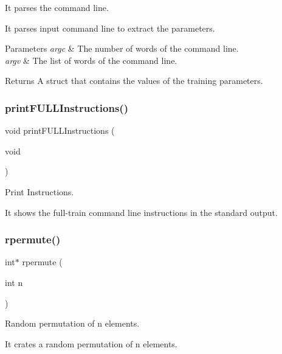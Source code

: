 It parses the command line. 

It parses input command line to extract the parameters. 
\begin{DoxyParams}{Parameters}
{\em argc} & The number of words of the command line. \\
\hline
{\em argv} & The list of words of the command line. \\
\hline
\end{DoxyParams}
\begin{DoxyReturn}{Returns}
A struct that contains the values of the training parameters. 
\end{DoxyReturn}
\hypertarget{full-train_8h_ab5adf9258f0268e7daead3642e1d911a}{}\label{full-train_8h_ab5adf9258f0268e7daead3642e1d911a} 
\subsubsection{\texorpdfstring{print\+F\+U\+L\+L\+Instructions()}{printFULLInstructions()}}
{\ttfamily void print\+F\+U\+L\+L\+Instructions (\begin{DoxyParamCaption}\item[{void}]{ }\end{DoxyParamCaption})}



Print Instructions. 

It shows the full-\/train command line instructions in the standard output. \hypertarget{full-train_8h_a9e75aabe599f48c66cbda89320d68a71}{}\label{full-train_8h_a9e75aabe599f48c66cbda89320d68a71} 
\subsubsection{\texorpdfstring{rpermute()}{rpermute()}}
{\ttfamily int$\ast$ rpermute (\begin{DoxyParamCaption}\item[{int}]{n }\end{DoxyParamCaption})}



Random permutation of n elements. 

It crates a random permutation of n elements.


